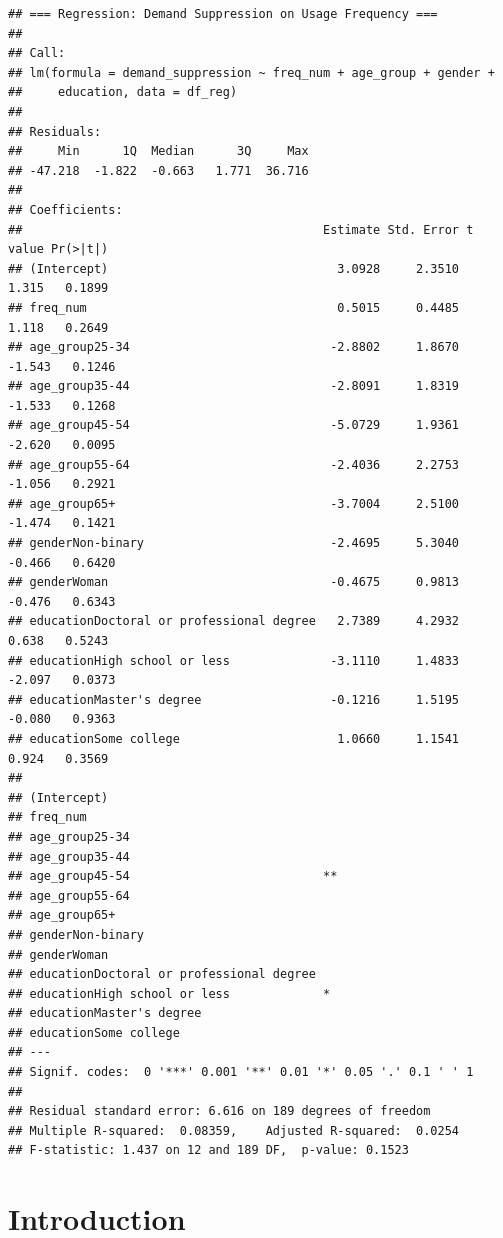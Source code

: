 \documentclass[
]{article}
\begin{document}
\begin{verbatim}
## === Regression: Demand Suppression on Usage Frequency ===
## 
## Call:
## lm(formula = demand_suppression ~ freq_num + age_group + gender + 
##     education, data = df_reg)
## 
## Residuals:
##     Min      1Q  Median      3Q     Max 
## -47.218  -1.822  -0.663   1.771  36.716 
## 
## Coefficients:
##                                          Estimate Std. Error t value Pr(>|t|)
## (Intercept)                                3.0928     2.3510   1.315   0.1899
## freq_num                                   0.5015     0.4485   1.118   0.2649
## age_group25-34                            -2.8802     1.8670  -1.543   0.1246
## age_group35-44                            -2.8091     1.8319  -1.533   0.1268
## age_group45-54                            -5.0729     1.9361  -2.620   0.0095
## age_group55-64                            -2.4036     2.2753  -1.056   0.2921
## age_group65+                              -3.7004     2.5100  -1.474   0.1421
## genderNon-binary                          -2.4695     5.3040  -0.466   0.6420
## genderWoman                               -0.4675     0.9813  -0.476   0.6343
## educationDoctoral or professional degree   2.7389     4.2932   0.638   0.5243
## educationHigh school or less              -3.1110     1.4833  -2.097   0.0373
## educationMaster's degree                  -0.1216     1.5195  -0.080   0.9363
## educationSome college                      1.0660     1.1541   0.924   0.3569
##                                            
## (Intercept)                                
## freq_num                                   
## age_group25-34                             
## age_group35-44                             
## age_group45-54                           **
## age_group55-64                             
## age_group65+                               
## genderNon-binary                           
## genderWoman                                
## educationDoctoral or professional degree   
## educationHigh school or less             * 
## educationMaster's degree                   
## educationSome college                      
## ---
## Signif. codes:  0 '***' 0.001 '**' 0.01 '*' 0.05 '.' 0.1 ' ' 1
## 
## Residual standard error: 6.616 on 189 degrees of freedom
## Multiple R-squared:  0.08359,    Adjusted R-squared:  0.0254 
## F-statistic: 1.437 on 12 and 189 DF,  p-value: 0.1523
\end{verbatim}

\newpage

\section{Introduction}\label{introduction}
\end{document}
